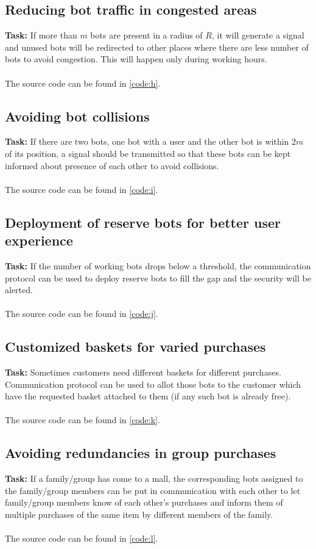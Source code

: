 \documentclass{article}
\begin{document}
\subsection{Reducing bot traffic in congested areas}
\textbf{Task: } If more than $m$ bots are present in a radius of $R$, it will generate a signal and unused bots will be redirected to other places where there are less number of bots to avoid congestion. This will happen only during working hours.
\\
\\
The source code can be found in \ref{code:h}.
\subsection{Avoiding bot collisions}
\textbf{Task: } If there are two bots, one bot with a user and the other bot is within $2m$ of its position, a signal should be transmitted so that these bots can be kept informed about presence of each other to avoid collisions.
\\
\\
The source code can be found in \ref{code:i}.
\subsection{Deployment of reserve bots for better user experience}
\textbf{Task: } If the number of working bots drops below a threshold, the communication protocol can be used to deploy reserve bots to fill the gap and the security will be alerted.
\\
\\
The source code can be found in \ref{code:j}.
\subsection{Customized baskets for varied purchases}
\textbf{Task: } Sometimes customers need different baskets for different purchases. Communication protocol can be used to allot those bots to the customer which have the requested basket attached to them (if any such bot is already free).
\\
\\
The source code can be found in \ref{code:k}.
\subsection{Avoiding redundancies in group purchases}
\textbf{Task: } If a family/group has come to a mall, the corresponding bots assigned to the family/group members can be put in communication with each other to let family/group members know of each other's purchases and inform them of multiple purchases of the same item by different members of the family.
\\
\\
The source code can be found in \ref{code:l}.
\end{document}
